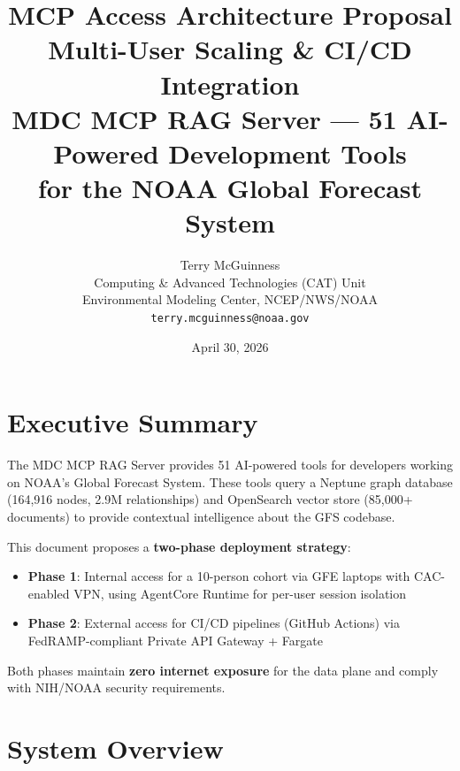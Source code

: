 \documentclass[11pt,letterpaper]{article}
\title{%
    \vspace{-1cm}
    \textcolor{noaablue}{\Large\textbf{MCP Access Architecture Proposal}}\\[0.3cm]
    \large Multi-User Scaling \& CI/CD Integration\\[0.2cm]
    \normalsize MDC MCP RAG Server — 51 AI-Powered Development Tools\\
    \normalsize for the NOAA Global Forecast System
}
\author{%
    Terry McGuinness\\
    \small Computing \& Advanced Technologies (CAT) Unit\\
    \small Environmental Modeling Center, NCEP/NWS/NOAA\\
    \small \texttt{terry.mcguinness@noaa.gov}
}
\date{April 30, 2026}
\begin{document}
\maketitle
\thispagestyle{fancy}

\section{Executive Summary}

The MDC MCP RAG Server provides 51 AI-powered tools for developers working on NOAA's Global Forecast System. These tools query a Neptune graph database (164,916 nodes, 2.9M relationships) and OpenSearch vector store (85,000+ documents) to provide contextual intelligence about the GFS codebase.

This document proposes a \textbf{two-phase deployment strategy}:

\begin{itemize}[leftmargin=*]
    \item \textbf{Phase 1}: Internal access for a 10-person cohort via GFE laptops with CAC-enabled VPN, using AgentCore Runtime for per-user session isolation
    \item \textbf{Phase 2}: External access for CI/CD pipelines (GitHub Actions) via FedRAMP-compliant Private API Gateway + Fargate
\end{itemize}

Both phases maintain \textbf{zero internet exposure} for the data plane and comply with NIH/NOAA security requirements.

\section{System Overview}
\end{document}

